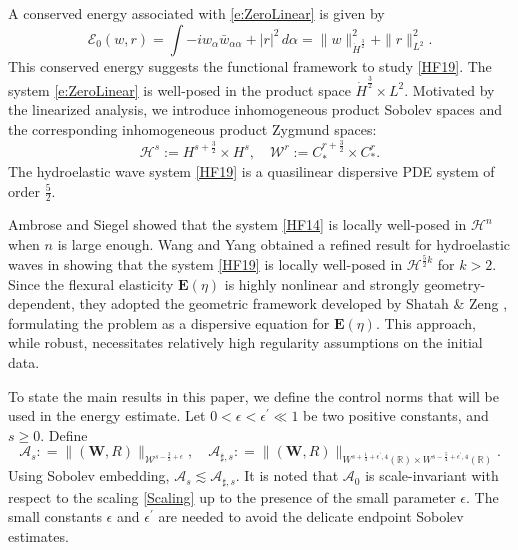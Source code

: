 \documentclass[10pt]{amsart}
\theoremstyle{remark}
\theoremstyle{definition}
\numberwithin{equation}{section}
\newcommand{\al}{\alpha}
\newcommand{\f}{\frac}
\newcommand{\bw}{\mathbf{W}}
\begin{document}
A conserved energy associated with \eqref{e:ZeroLinear} is given by
\begin{equation}
    \mathcal{E}_0(w,r) = \int -iw_\al \bar{w}_{\al \al}  + |r|^2\, d\alpha = \|w\|_{\dot{H}^\f32}^2 + \|r\|_{L^2}^2. \label{ConservedEnergy}
\end{equation}
This conserved energy suggests the functional framework to study \eqref{HF19}.
The system \eqref{e:ZeroLinear} is well-posed in the product space $\dot{H}^\f32 \times L^2$.
Motivated by the linearized analysis, we introduce inhomogeneous product Sobolev spaces and the corresponding inhomogeneous product Zygmund spaces:
	\[
	\mathcal{H}^s :=H^{s+\f32}\times H^{s}, \quad \mathcal{W}^r :=  C^{r+\f32}_{*}\times C^r_{*}.
	\]
The hydroelastic wave system \eqref{HF19} is a quasilinear dispersive PDE system of order $\f{5}{2}$.

Ambrose and Siegel \cite{MR3656704} showed that the system \eqref{HF14} is locally well-posed in $\mathcal{H}^{n}$ when $n$ is large enough.
Wang and Yang obtained a refined result for hydroelastic waves  in \cite{MR4104949} showing that the system \eqref{HF19} is locally well-posed in $\mathcal{H}^{\f52k}$ for $k>2$. 
Since the flexural elasticity $\mathbf{E}(\eta)$ is highly nonlinear and strongly geometry-dependent, they adopted the geometric framework developed by Shatah \& Zeng \cite{MR2388661,MR2400608,MR2763036}, formulating the problem as a dispersive equation for $\mathbf{E}(\eta)$. 
This approach, while robust, necessitates relatively high regularity assumptions on the initial data.
	
To state the main results in this paper, we define the control norms that will be used in the energy estimate.
Let $0<\epsilon<\epsilon^{'} \ll 1$ be two positive constants, and $s\geq 0$. Define
\begin{equation*}
\mathcal{A}_s : = \|(\bw, R) \|_{\mathcal{W}^{s- \f32+\epsilon}}, \quad \mathcal{A}_{\sharp,s} : = \|(\bw, R) \|_{W^{s+\f14+\epsilon^{'},4}(\mathbb{R})\times W^{s-\f54+\epsilon^{'},4}(\mathbb{R})}.
\end{equation*}
Using Sobolev embedding, $\mathcal{A}_s \lesssim \mathcal{A}_{\sharp, s}$.
It is noted that $\mathcal{A}_0$ is scale-invariant with respect to the scaling \eqref{Scaling} up to the presence of the small parameter $\epsilon$.
The small constants $\epsilon$ and $\epsilon^{'}$ are needed to avoid the delicate endpoint Sobolev estimates.
	
\end{document}
